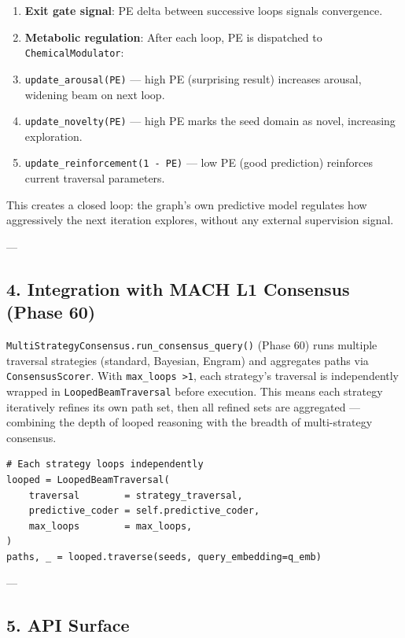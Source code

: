 \begin{enumerate}
\item \textbf{Exit gate signal}: PE delta between successive loops signals convergence.
\item \textbf{Metabolic regulation}: After each loop, PE is dispatched to \texttt{ChemicalModulator}:
\item \texttt{update\_arousal(PE)} — high PE (surprising result) increases arousal, widening beam on next loop.
\item \texttt{update\_novelty(PE)} — high PE marks the seed domain as novel, increasing exploration.
\item \texttt{update\_reinforcement(1 - PE)} — low PE (good prediction) reinforces current traversal parameters.

\end{enumerate}
This creates a closed loop: the graph's own predictive model regulates how aggre\-ssively the next iteration explores, without any external supervision signal.

---

\subsection{4. Integration with MACH L1 Consensus (Phase 60)}

\texttt{MultiStrategyConsensus.run\_consensus\_query()} (Phase 60) runs multiple traversal strategies (standard, Bayesian, Engram) and aggregates paths via \texttt{ConsensusScorer}. With \texttt{max\_loops \textgreater  1}, each strategy's traversal is indep\-endently wrapped in \texttt{LoopedBeamTraversal} before execution. This means each strategy iteratively refines its own path set, then all refined sets are aggregated — combining the depth of looped reasoning with the breadth of multi-strategy consensus.

\begin{lstlisting}
# Each strategy loops independently
looped = LoopedBeamTraversal(
    traversal        = strategy_traversal,
    predictive_coder = self.predictive_coder,
    max_loops        = max_loops,
)
paths, _ = looped.traverse(seeds, query_embedding=q_emb)
\end{lstlisting}

---

\subsection{5. API Surface}

